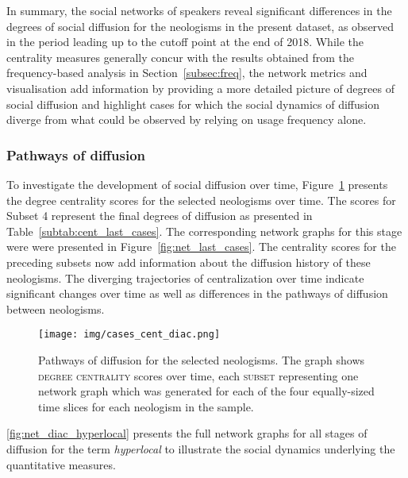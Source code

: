 \documentclass[
  a4paper,
  abstract=on,
  captions=tableabove,
  ]{scrartcl}
\newcommand{\ol}[1]{\emph{#1}}
\begin{document}
      In summary, the social networks of speakers reveal significant differences in the degrees of social diffusion for the neologisms in the present dataset, as observed in the period leading up to the cutoff point at the end of 2018. While the centrality measures generally concur with the results obtained from the frequency-based analysis in Section~\ref{subsec:freq}, the network metrics and visualisation add information by providing a more detailed picture of degrees of social diffusion and highlight cases for which the social dynamics of diffusion diverge from what could be observed by relying on usage frequency alone.


    \subsubsection{Pathways of diffusion}

      To investigate the development of social diffusion over time, Figure~\ref{fig:cent_diac_cases} presents the degree centrality scores for the selected neologisms over time. The scores for Subset 4 represent the final degrees of diffusion as presented in Table~\ref{subtab:cent_last_cases}. The corresponding network graphs for this stage were were presented in Figure~\ref{fig:net_last_cases}. The centrality scores for the preceding subsets now add information about the diffusion history of these neologisms. The diverging trajectories of centralization over time indicate significant changes over time as well as differences in the pathways of diffusion between neologisms.

      \begin{figure}
        \caption[Centralization over time for the selected neologisms]{Pathways of diffusion for the selected neologisms. The graph shows \textsc{degree centrality} scores over time, each \textsc{subset} representing one network graph which was generated for each of the four equally-sized time slices for each neologism in the sample.}
        \label{fig:cent_diac_cases}
        \centering
        \texttt{[image: img/cases\_cent\_diac.png]}
      \end{figure}

      \ref{fig:net_diac_hyperlocal} presents the full network graphs for all stages of diffusion for the term \ol{hyperlocal} to illustrate the social dynamics underlying the quantitative measures.
\end{document}
